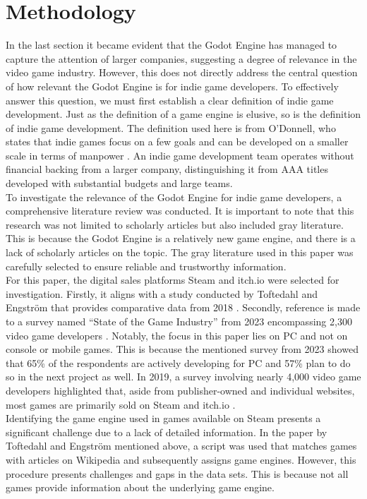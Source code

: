 \section{Methodology}
In the last section it became evident that the Godot Engine has managed to capture the attention of larger companies, suggesting a degree of relevance in the video game industry.
However, this does not directly address the central question of how relevant the Godot Engine is for indie game developers.
To effectively answer this question, we must first establish a clear definition of indie game development.
Just as the definition of a game engine is elusive, so is the definition of indie game development.
The definition used here is from O'Donnell, who states that indie games focus on a few goals and can be developed on a smaller scale in terms of manpower \cite{indie-definition}.
An indie game development team operates without financial backing from a larger company, distinguishing it from AAA titles developed with substantial budgets and large teams. \\

To investigate the relevance of the Godot Engine for indie game developers, a comprehensive literature review was conducted.
It is important to note that this research was not limited to scholarly articles but also included gray literature.
This is because the Godot Engine is a relatively new game engine, and there is a lack of scholarly articles on the topic.
The gray literature used in this paper was carefully selected to ensure reliable and trustworthy information. \\ 

For this paper, the digital sales platforms Steam and itch.io were selected for investigation.
Firstly, it aligns with a study conducted by Toftedahl and Engström that provides comparative data from 2018 \cite{game-engine-taxonomy}.
Secondly, reference is made to a survey named ``State of the Game Industry'' from 2023 encompassing 2,300 video game developers \cite{gdc-2023}.
Notably, the focus in this paper lies on PC and not on console or mobile games.
This is because the mentioned survey from 2023 showed that 65\% of the respondents are actively developing for PC and 57\% plan to do so in the next project as well.
In 2019, a survey involving nearly 4,000 video game developers highlighted that, aside from publisher-owned and individual websites, most games are primarily sold on Steam and itch.io \cite{gdc-2019}.\\

Identifying the game engine used in games available on Steam presents a significant challenge due to a lack of detailed information.
In the paper by Toftedahl and Engström mentioned above, a script was used that matches games with articles on Wikipedia and subsequently assigns game engines.
However, this procedure presents challenges and gaps in the data sets.
This is because not all games provide information about the underlying game engine. \\


